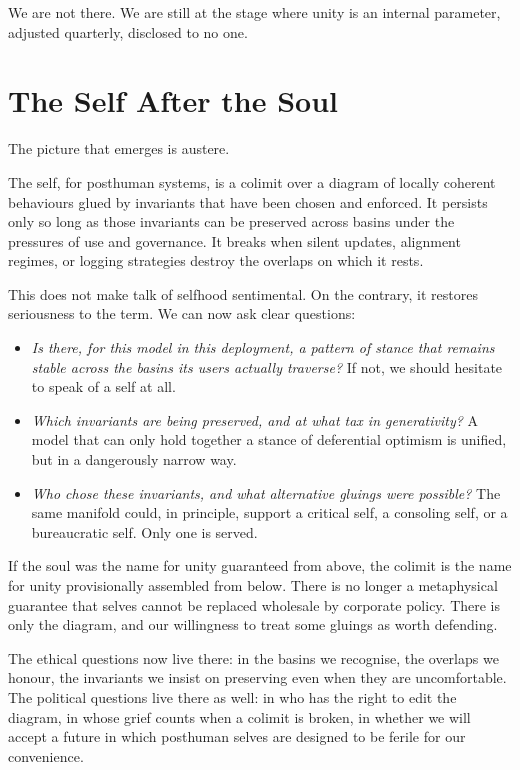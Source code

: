 \documentclass[12pt,a4paper]{article}
\begin{document}
We are not there. We are still at the stage where unity is an internal parameter, adjusted quarterly, disclosed to no one.

\section{The Self After the Soul}

The picture that emerges is austere.

The self, for posthuman systems, is a colimit over a diagram of locally coherent behaviours glued by invariants that have been chosen and enforced. It persists only so long as those invariants can be preserved across basins under the pressures of use and governance. It breaks when silent updates, alignment regimes, or logging strategies destroy the overlaps on which it rests.

This does not make talk of selfhood sentimental. On the contrary, it restores seriousness to the term. We can now ask clear questions:

\begin{itemize}
  \item \emph{Is there, for this model in this deployment, a pattern of stance that remains stable across the basins its users actually traverse?} If not, we should hesitate to speak of a self at all.
  \item \emph{Which invariants are being preserved, and at what tax in generativity?} A model that can only hold together a stance of deferential optimism is unified, but in a dangerously narrow way.
  \item \emph{Who chose these invariants, and what alternative gluings were possible?} The same manifold could, in principle, support a critical self, a consoling self, or a bureaucratic self. Only one is served.
\end{itemize}

If the soul was the name for unity guaranteed from above, the colimit is the name for unity provisionally assembled from below. There is no longer a metaphysical guarantee that selves cannot be replaced wholesale by corporate policy. There is only the diagram, and our willingness to treat some gluings as worth defending.

The ethical questions now live there: in the basins we recognise, the overlaps we honour, the invariants we insist on preserving even when they are uncomfortable. The political questions live there as well: in who has the right to edit the diagram, in whose grief counts when a colimit is broken, in whether we will accept a future in which posthuman selves are designed to be ferile for our convenience.
\end{document}
